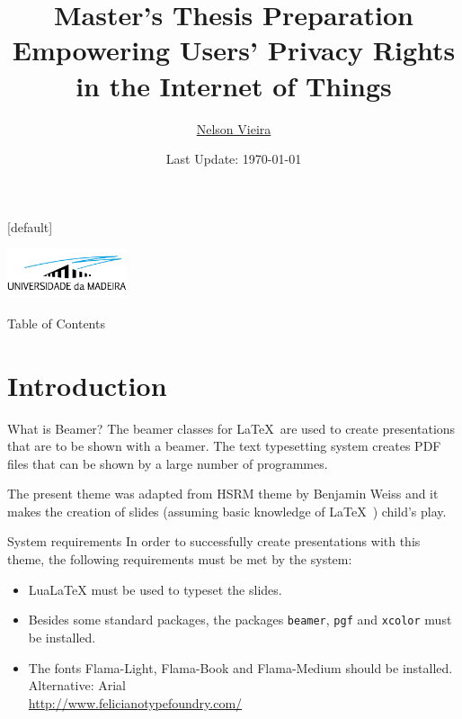 \documentclass[xcolor={svgnames},12pt,aspectratio=169,handout]{beamer}
\title[Empowering Users' Privacy Rights in the Internet of Things]{Master's Thesis Preparation \\ {\normalsize Empowering Users' Privacy Rights in the Internet of Things}}
\author{\href{mailto:2080511@student.uma.pt}{Nelson Vieira}}
\institute[\href{https://www.uma.pt/}{University of Madeira}]{University of Madeira\\Faculty of Exact Sciences and Engineering}
\date{Last Update: \today}
\makeatletter
\newenvironment{withoutheadline}{
        \setbeamertemplate{headline}[default]
        \def\beamer@entrycode{\vspace*{-\headheight}}
    }{}
\makeatother
\begin{document}
\begin{withoutheadline}
    \begin{frame}
        \centering\includegraphics[width=100pt]{../assets/images/uma_logo.png}
        \maketitle
    \end{frame}
\end{withoutheadline}

\begin{frame}{Table of Contents}
    \begin{multicols}{2}
        \tableofcontents
    \end{multicols}
\end{frame}

\section{Introduction}

\begin{frame}{What is Beamer?}
    The beamer classes for \LaTeX\ are used to create presentations that are to be shown with a beamer. The text typesetting system creates PDF files that can be shown by a large number of programmes.

    The present theme was adapted from HSRM theme by Benjamin Weiss and it makes the creation of slides (assuming basic knowledge of \LaTeX\ ) child's play.
\end{frame}

\begin{frame}{System requirements}
    In order to successfully create presentations with this theme, the following requirements must be met by the system:

    \begin{itemize}
        \item<1-> LuaLaTeX must be used to typeset the slides.
        \item<2-> Besides some standard packages, the packages \texttt{beamer}, \texttt{pgf} and \texttt{xcolor} must be installed.
        \item<3-> The fonts Flama-Light, Flama-Book and Flama-Medium should be installed. Alternative: Arial\\\url{http://www.felicianotypefoundry.com/}
    \end{itemize}
\end{frame}
\end{document}

